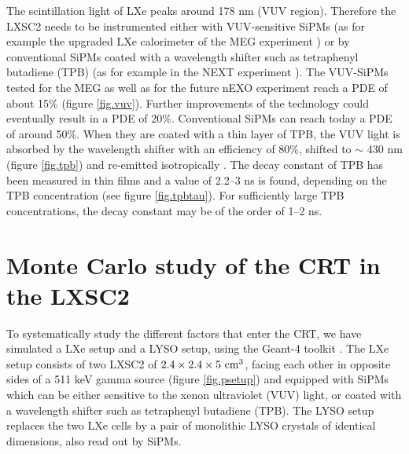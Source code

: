 \documentclass[11pt,a4paper]{article}
\begin{document}
The scintillation light of LXe peaks around 178 nm (VUV region). Therefore the LXSC2 needs to be instrumented either with VUV-sensitive SiPMs (as for example the upgraded LXe calorimeter of the 
MEG experiment \cite{Ogawa:2015ucj}) or by conventional SiPMs coated with a wavelength shifter such as tetraphenyl butadiene (TPB) (as for example in the NEXT experiment \cite{Alvarez:2013gxa}). 
The VUV-SiPMs tested for the MEG as well as for the future nEXO 
experiment \cite{Ogawa:2015ucj,Ostrovskiy:2015oja} reach a PDE of about 
15\% (figure \ref{fig.vuv}). Further improvements of the technology could eventually result in a PDE of 20\%.  Conventional SiPMs can reach today a PDE of around 50\%. When they are coated with a thin layer of TPB, the VUV light is absorbed by the wavelength shifter with an efficiency of 80\%,  
shifted to $\sim$ 430 nm 
(figure \ref{fig.tpb}) 
and re-emitted isotropically \cite{Gehman:2011xm}. The decay constant of TPB has been measured  in thin films \cite{TPBtau} and a value of 2.2--3 ns is found, depending on the TPB concentration (see figure \ref{fig.tpbtau}). For sufficiently large TPB concentrations, the decay constant may be of the order of 1--2 ns. 
%

\section{Monte Carlo study of the CRT in the LXSC2} 
\label{sec.CRT}

To systematically study the different factors that enter the CRT, we have simulated a LXe setup and a LYSO setup, using the Geant-4 toolkit \cite{Agostinelli:2002hh}. The LXe setup consists of two LXSC2 of 
$2.4 \times 2.4 \times 5 {\rm ~cm^3}$, facing each other in opposite sides of a 511 keV gamma source 
(figure \ref{fig.psetup}) and equipped with SiPMs which can be either sensitive to the xenon ultraviolet (VUV) light, or coated with a wavelength shifter such as tetraphenyl butadiene (TPB). The  LYSO setup replaces the two LXe cells by a pair of  monolithic LYSO crystals of identical dimensions, also read out by SiPMs.
\end{document}
